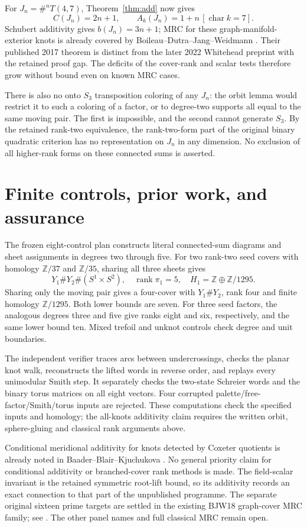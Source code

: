 \documentclass[11pt]{article}
\newcommand{\rank}{\operatorname{rank}}
\newcommand{\Z}{\mathbb Z}
\begin{document}
For $J_n=\#^nT(4,7)$, Theorem~\ref{thm:add} now gives
\[
 C(J_n)=2n+1,\qquad A_k(J_n)=1+n\,[\operatorname{char}k=7].
\]
Schubert additivity gives $b(J_n)=3n+1$; MRC for these
graph-manifold-exterior knots is already covered by
Boileau--Dutra--Jang--Weidmann \cite[Corollary 1]{bdjw}.
Their published 2017 theorem is distinct from the later
2022 Whitehead preprint with the retained proof gap.
The deficits of the cover-rank and scalar tests therefore
grow without bound even on known MRC cases.

There is also no onto $S_3$ transposition coloring of any
$J_n$: the orbit lemma would restrict it to such a coloring
of a factor, or to degree-two supports all equal to the same
moving pair. The first is impossible, and the second cannot
generate $S_3$. By the retained rank-two equivalence, the
rank-two-form part of the original binary quadratic criterion
has no representation on $J_n$ in any dimension. No exclusion
of all higher-rank forms on these connected sums is asserted.

\section{Finite controls, prior work, and assurance}

The frozen eight-control plan constructs literal connected-sum
diagrams and sheet assignments in degrees two through five.
For two rank-two seed covers with homology $\Z/37$ and
$\Z/35$, sharing all three sheets gives
\[
 Y_1\#Y_2\#(S^1\times S^2),\quad\rank\pi_1=5,
 \quad H_1=\Z\oplus\Z/1295.
\]
Sharing only the moving pair gives a four-cover with
$Y_1\#Y_2$, rank four and finite homology $\Z/1295$.
Both lower bounds are seven. For three seed factors,
the analogous degrees three and five give ranks eight
and six, respectively, and the same lower bound ten.
Mixed trefoil and unknot controls check degree and unit
boundaries.

The independent verifier traces arcs between undercrossings,
checks the planar knot walk, reconstructs the lifted words
in reverse order, and replays every unimodular Smith step.
It separately checks the two-state Schreier words and the
binary torus matrices on all eight vectors. Four corrupted
palette/free-factor/Smith/torus inputs are rejected.
These computations check the specified inputs and homology;
the all-knots additivity claim requires the written orbit,
sphere-gluing and classical rank arguments above.

Conditional meridional additivity for knots detected by
Coxeter quotients is already noted in Baader--Blair--Kjuchukova
\cite[Introduction]{bbk}. No general priority claim for
conditional additivity or branched-cover rank methods is made.
The field-scalar invariant is the retained symmetric root-lift
bound, so its additivity records an exact connection to that
part of the unpublished programme. The separate original sixteen
prime targets are settled in the existing BJW18 graph-cover MRC family;
see . The other
panel names and full classical MRC remain open.
\end{document}
